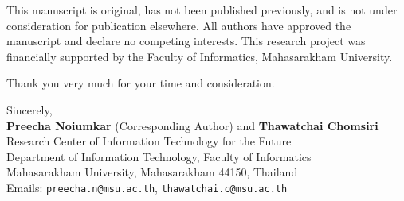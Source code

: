\documentclass[11pt,a4paper]{article}
\begin{document}
This manuscript is original, has not been published previously, and is not under consideration for publication elsewhere. All authors have approved the manuscript and declare no competing interests. This research project was financially supported by the Faculty of Informatics, Mahasarakham University.

Thank you very much for your time and consideration.

\vspace{0.8em}
Sincerely,\\[0.5em]
\textbf{Preecha Noiumkar} (Corresponding Author) and \textbf{Thawatchai Chomsiri}\\
Research Center of Information Technology for the Future\\
Department of Information Technology, Faculty of Informatics\\
Mahasarakham University, Mahasarakham 44150, Thailand\\
Emails: \texttt{preecha.n@msu.ac.th}, \texttt{thawatchai.c@msu.ac.th}
\end{document}
